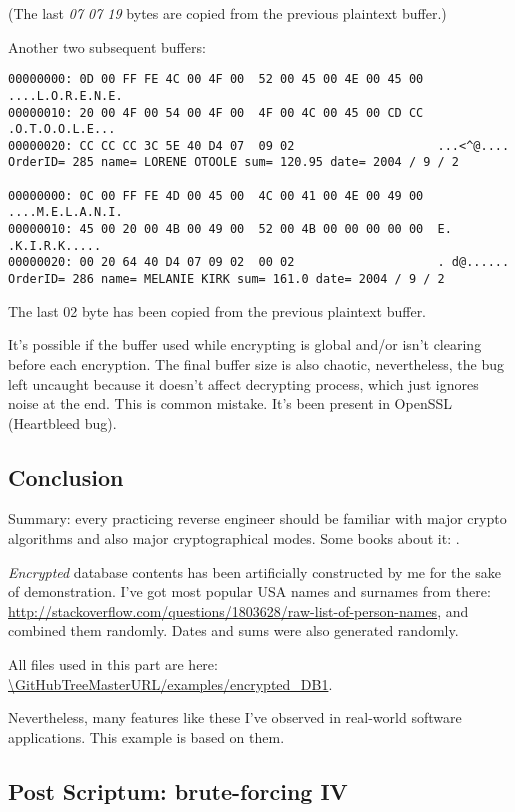 (The last \emph{07 07 19} bytes are copied from the previous plaintext buffer.)

Another two subsequent buffers:

\begin{lstlisting}
00000000: 0D 00 FF FE 4C 00 4F 00  52 00 45 00 4E 00 45 00  ....L.O.R.E.N.E.
00000010: 20 00 4F 00 54 00 4F 00  4F 00 4C 00 45 00 CD CC   .O.T.O.O.L.E...
00000020: CC CC CC 3C 5E 40 D4 07  09 02                    ...<^@....
OrderID= 285 name= LORENE OTOOLE sum= 120.95 date= 2004 / 9 / 2

00000000: 0C 00 FF FE 4D 00 45 00  4C 00 41 00 4E 00 49 00  ....M.E.L.A.N.I.
00000010: 45 00 20 00 4B 00 49 00  52 00 4B 00 00 00 00 00  E. .K.I.R.K.....
00000020: 00 20 64 40 D4 07 09 02  00 02                    . d@......
OrderID= 286 name= MELANIE KIRK sum= 161.0 date= 2004 / 9 / 2
\end{lstlisting}

The last 02 byte has been copied from the previous plaintext buffer.

It's possible if the buffer used while encrypting is global and/or isn't clearing before
each encryption.
The final buffer size is also chaotic, nevertheless, the bug left uncaught
because it doesn't affect decrypting process, which just ignores noise at the end.
This is common mistake.
It's been present in OpenSSL (Heartbleed bug).

\subsection{Conclusion}

Summary:
every practicing reverse engineer should be familiar with major crypto algorithms and
also major cryptographical modes.
Some books about it: .

\emph{Encrypted} database contents has been artificially constructed by me for the sake of demonstration.
I've got most popular USA names and surnames from there: \url{http://stackoverflow.com/questions/1803628/raw-list-of-person-names},
and combined them randomly.
Dates and sums were also generated randomly.

All files used in this part are here: \url{\GitHubTreeMasterURL/examples/encrypted_DB1}.

Nevertheless, many features like these I've observed in real-world software applications.
This example is based on them.

\subsection{Post Scriptum: brute-forcing \ac{IV}}

